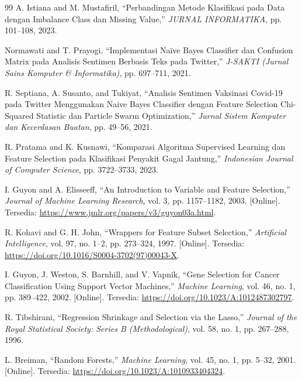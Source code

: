 \documentclass[a4paper,oneside,12pt]{report}
\renewcommand{\bibname}{Daftar Pustaka}
\begin{document}
\clearpage

\renewcommand{\bibname}{Daftar Pustaka}
\begin{thebibliography}{99}
     A. Istiana and M. Mustafiril, ``Perbandingan Metode Klasifikasi pada Data dengan Imbalance Class dan Missing Value,'' \textit{JURNAL INFORMATIKA}, pp. 101--108, 2023.

     Normawati and T. Prayogi, ``Implementasi Naïve Bayes Classifier dan Confusion Matrix pada Analisis Sentimen Berbasis Teks pada Twitter,'' \textit{J-SAKTI (Jurnal Sains Komputer \& Informatika)}, pp. 697--711, 2021.

     R. Septiana, A. Susanto, and Tukiyat, ``Analisis Sentimen Vaksinasi Covid-19 pada Twitter Menggunakan Naive Bayes Classifier dengan Feature Selection Chi-Squared Statistic dan Particle Swarm Optimization,'' \textit{Jurnal Sistem Komputer dan Kecerdasan Buatan}, pp. 49--56, 2021.

     R. Pratama and K. Kusnawi, ``Komparasi Algoritma Supervised Learning dan Feature Selection pada Klasifikasi Penyakit Gagal Jantung,'' \textit{Indonesian Journal of Computer Science}, pp. 3722--3733, 2023.

     I. Guyon and A. Elisseeff, ``An Introduction to Variable and Feature Selection,'' \textit{Journal of Machine Learning Research}, vol. 3, pp. 1157--1182, 2003. [Online]. Tersedia: \url{https://www.jmlr.org/papers/v3/guyon03a.html}.

     R. Kohavi and G. H. John, ``Wrappers for Feature Subset Selection,'' \textit{Artificial Intelligence}, vol. 97, no. 1--2, pp. 273--324, 1997. [Online]. Tersedia: \url{https://doi.org/10.1016/S0004-3702(97)00043-X}.

     I. Guyon, J. Weston, S. Barnhill, and V. Vapnik, ``Gene Selection for Cancer Classification Using Support Vector Machines,'' \textit{Machine Learning}, vol. 46, no. 1, pp. 389--422, 2002. [Online]. Tersedia: \url{https://doi.org/10.1023/A:1012487302797}.

     R. Tibshirani, ``Regression Shrinkage and Selection via the Lasso,'' \textit{Journal of the Royal Statistical Society: Series B (Methodological)}, vol. 58, no. 1, pp. 267--288, 1996.

     L. Breiman, ``Random Forests,'' \textit{Machine Learning}, vol. 45, no. 1, pp. 5--32, 2001. [Online]. Tersedia: \url{https://doi.org/10.1023/A:1010933404324}.


\end{thebibliography}
\end{document}
